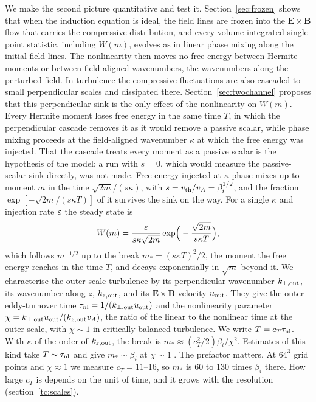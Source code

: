 We make the second picture quantitative and test it. Section~\ref{sec:frozen} shows that when the induction equation is ideal, the field lines are frozen into the $\boldsymbol E\times\boldsymbol B$ flow that carries the compressive distribution, and every volume-integrated single-point statistic, including $W(m)$, evolves as in linear phase mixing along the initial field lines. The nonlinearity then moves no free energy between Hermite moments or between field-aligned wavenumbers, the wavenumbers along the perturbed field. In turbulence the compressive fluctuations are also cascaded to small perpendicular scales and dissipated there. Section~\ref{sec:twochannel} proposes that this perpendicular sink is the only effect of the nonlinearity on $W(m)$. Every Hermite moment loses free energy in the same time $T$, in which the perpendicular cascade removes it as it would remove a passive scalar, while phase mixing proceeds at the field-aligned wavenumber $\kappa$ at which the free energy was injected. That the cascade treats every moment as a passive scalar is the hypothesis of the model; a run with $s=0$, which would measure the passive-scalar sink directly, was not made.
 Free energy injected at $\kappa$ phase mixes up to moment $m$ in the time $\sqrt{2m}/(s\kappa)$, with $s=v_{\mathrm{th}}/v_A=\beta_i^{1/2}$, and the fraction $\exp[-\sqrt{2m}/(s\kappa T)]$ of it survives the sink on the way. For a single $\kappa$ and injection rate $\varepsilon$ the steady state is
\begin{equation}\label{eq:intro-W}
  W(m)=\frac{\varepsilon}{s\kappa\sqrt{2m}}\exp\!\Big(-\frac{\sqrt{2m}}{s\kappa T}\Big),
\end{equation}
which follows $m^{-1/2}$ up to the break $m_*=(s\kappa T)^2/2$, the moment the free energy reaches in the time $T$, and decays exponentially in $\sqrt m$ beyond it. We characterise the outer-scale turbulence by its perpendicular wavenumber $k_{\perp,\rm out}$, its wavenumber along $z$, $k_{z,\rm out}$, and its $\boldsymbol E\times\boldsymbol B$ velocity $u_{\rm out}$. They give the outer eddy-turnover time $\tau_{\rm nl}=1/(k_{\perp,\rm out}u_{\rm out})$ and the nonlinearity parameter $\chi=k_{\perp,\rm out}u_{\rm out}/(k_{z,\rm out}v_A)$, the ratio of the linear to the nonlinear time at the outer scale, with $\chi\sim1$ in critically balanced turbulence. We write $T=c_T\tau_{\rm nl}$. With $\kappa$ of the order of $k_{z,\rm out}$, the break is $m_*\approx(c_T^2/2)\beta_i/\chi^2$. Estimates of this kind take $T\sim\tau_{\rm nl}$ and give $m_*\sim\beta_i$ at $\chi\sim1$ \citep{Schekochihin2016,Kawazura2019}. The prefactor matters. At $64^3$ grid points and $\chi\approx1$ we measure $c_T=11$--16, so $m_*$ is 60 to 130 times $\beta_i$ there. How large $c_T$ is depends on the unit of time, and it grows with the resolution (section~\ref{tc:scales}).

